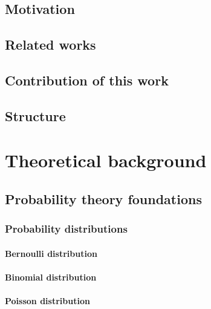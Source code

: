 \documentclass[english,master,unicode]{ctufit-thesis}
\theoremstyle{plain}
\theoremstyle{definition}
\theoremstyle{remark}
\numberwithin{theorem}{chapter}
\begin{document}
\section*{Motivation}
\section*{Related works}
\section*{Contribution of this work}
\section*{Structure}

\chapter{Theoretical background}\label{ch:theory}
    \section{Probability theory foundations}\label{sec:prob-foundations}
        
        \subsection{Probability distributions}\label{sec:prob-distributions}
            
            \subsubsection{Bernoulli distribution}\label{sec:bernoulli-distribution}
                
            \subsubsection{Binomial distribution}\label{sec:binomial-distribution}
                
            \subsubsection{Poisson distribution}\label{sec:poisson-distribution}
                
\end{document}
